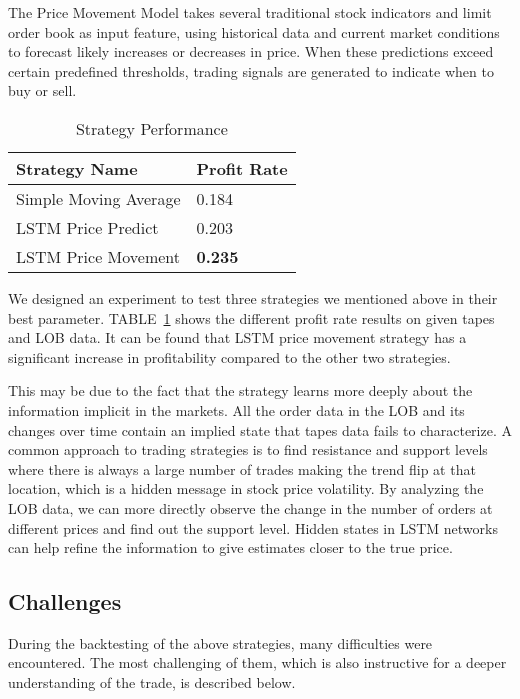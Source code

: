 \documentclass[conference]{IEEEtran}
\begin{document}
The Price Movement Model takes several traditional stock indicators and limit order book as input feature, using historical data and current market conditions to forecast likely increases or decreases in price. When these predictions exceed certain predefined thresholds, trading signals are generated to indicate when to buy or sell.

\begin{table}[tb]
\caption{Strategy Performance }
\begin{center}
\begin{tabular}{|p{}|p{}|}
\hline
\textbf{Strategy Name} & \textbf{Profit Rate} \\
\hline
Simple Moving Average& 0.184 \\
\hline
LSTM Price Predict& 0.203 \\
\hline
LSTM Price Movement& \textbf{0.235} \\

\hline
\end{tabular}
\label{all}
\end{center}
\end{table}

We designed an experiment to test three strategies we mentioned above in their best parameter. TABLE~\ref{all} shows the different profit rate results on given tapes and LOB data. It can be found that LSTM price movement strategy has a significant increase in profitability compared to the other two strategies.

This may be due to the fact that the strategy learns more deeply about the information implicit in the markets. All the order data in the LOB and its changes over time contain an implied state that tapes data fails to characterize. A common approach to trading strategies is to find resistance and support levels where there is always a large number of trades making the trend flip at that location, which is a hidden message in stock price volatility. By analyzing the LOB data, we can more directly observe the change in the number of orders at different prices and find out the support level. Hidden states in LSTM networks can help refine the information to give estimates closer to the true price.

\subsection{Challenges}

During the backtesting of the above strategies, many difficulties were encountered. The most challenging of them, which is also instructive for a deeper understanding of the trade, is described below. 
\end{document}
